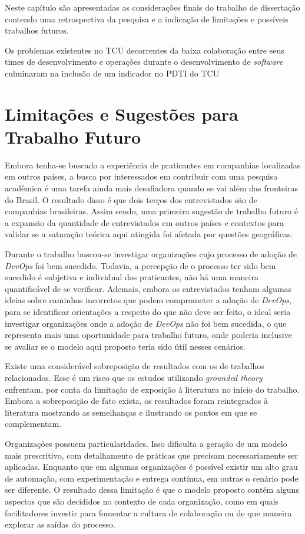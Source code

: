 Neste capítulo são apresentadas as considerações finais do trabalho de
dissertação contendo uma retrospectiva da pesquisa e a indicação de limitações
e possíveis trabalhos futuros.

Os problemas existentes no \acrshort{TCU} decorrentes da baixa colaboração entre
seus times de desenvolvimento e operações durante o desenvolvimento de {\it software}
culminaram na inclusão de um indicador no \acrshort{PDTI} do \acrshort{TCU}

\section{Limitações e Sugestões para Trabalho Futuro}\label{limitacoes}

Embora tenha-se buscado a experiência de praticantes em companhias localizadas
em outros países, a busca por interessados em contribuir com uma pesquisa
acadêmica é uma tarefa ainda mais desafiadora quando se vai além das fronteiras
do Brasil. O resultado disso é que dois terços dos entrevistados são de
companhias brasileiras. Assim sendo, uma primeira sugestão de trabalho
futuro é a expansão da quantidade de entrevistados em outros países e contextos
para validar se a saturação teórica aqui atingida foi afetada por questões
geográficas.

Durante o trabalho buscou-se investigar organizações cujo processo de
adoção de {\it DevOps} foi bem sucedido. Todavia, a percepção de o processo ter
sido bem sucedido é subjetiva e individual dos praticantes, não há uma maneira
quantificável de se verificar. Ademais, embora os entrevistados tenham algumas
ideias sobre caminhos incorretos que podem comprometer a adoção de {\it DevOps},
para se identificar orientações a respeito do que não deve ser feito, o ideal
seria investigar organizações onde a adoção de {\it DevOps} não foi bem
sucedida, o que representa mais uma oportunidade para trabalho futuro, onde
poderia inclusive se avaliar se o modelo aqui proposto teria sido útil nesses
cenários.

Existe uma considerável sobreposição de resultados com os de trabalhos
relacionados. Esse é um risco que os estudos utilizando {\it grounded theory}
enfrentam, por conta da limitação de exposição à literatura no início do
trabalho. Embora a sobreposição de fato exista, os resultados foram reintegrados
à literatura mostrando as semelhanças e ilustrando os pontos em que se
complementam.

Organizações possuem particularidades. Isso dificulta a geração de um
modelo mais prescritivo, com detalhamento de práticas que precisam
necessariamente ser aplicadas. Enquanto que em algumas organizações é possível
existir um alto grau de automação, com experimentação e entrega contínua, em
outras o cenário pode ser diferente. O resultado dessa limitação é que o modelo
proposto contém alguns aspectos que são decididos no contexto de cada
organização, como em quais facilitadores investir para fomentar a cultura de
colaboração ou de que maneira explorar as saídas do processo.

